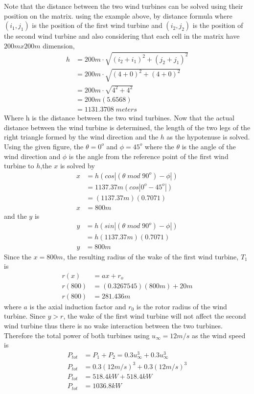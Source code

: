     Note that the distance between the two wind turbines can be solved using their position on the matrix. using the example above, by distance formula where $(i_{1},j_{1})$ is the position of the first wind turbine and $(i_{2},j_{2})$ is the position of the second wind turbine and also considering that each cell in the matrix have $200mx200m$ dimension,
        \begin{align*}
            h &= 200m\cdot \sqrt{(i_{2}+i_{1})^{2}+(j_{2}+j_{1})^{2}}\\
             &= 200m\cdot \sqrt{(4+0)^{2}+(4+0)^{2}} \\
             &= 200m\cdot \sqrt{4^{2}+4^{2}} \\
             &= 200m(5.6568) \\
             &= 1131.3708\;meters
        \end{align*}
    Where h is the distance between the two wind turbines. Now that the actual distance between the wind turbine is determined, the length of the two legs of the right triangle formed by the wind direction and the $h$ as the hypotenuse is solved. Using the given figure, the $\theta=0^{o}$ and $\phi=45^{o}$ where the $\theta$ is the angle of the wind direction and $\phi$ is the angle from the reference point of the first wind turbine to $h$,the $x$ is solved by
        \begin{align*}
            x &= h(cos|(\theta\;mod\;90^{o})-\phi|) \\
              &= 1137.37m(cos|0^{o}-45^{o}|) \\
              &= (1137.37m)(0.7071) \\
            x &= 800m
        \end{align*}
    and the $y$ is
        \begin{align*}
            y &= h(sin|(\theta\;mod\;90^{o})-\phi|) \\
              &= h(1137.37m)(0.7071) \\
            y  &= 800m
        \end{align*}
    Since the $x=800m$, the resulting radius of the wake of the first wind turbine, $T_{1}$ is
        \begin{align*}
            r(x)   &= ax + r_{o} \\
            r(800) &= (0.3267545)(800m) + 20m \\
            r(800) &= 281.436m
        \end{align*}
    where $a$ is the axial induction factor and $r_{0}$ is the rotor radius of the wind turbine. Since $y>r$, the wake of the first wind turbine will not affect the second wind turbine thus there is no wake interaction between the two turbines. Therefore the total power of both turbines using $u_{\infty}=12m/s$ as the wind speed is
        \begin{align*}
            P_{tot} &= P_{1} + P_{2} = 0.3u_{\infty}^{3} + 0.3u_{\infty}^{3} \\
            P_{tot} &= 0.3(12m/s)^{3} + 0.3(12m/s)^{3} \\
            P_{tot} &= 518.4kW + 518.4kW\\
            P_{tot} &= 1036.8kW
        \end{align*}
        
